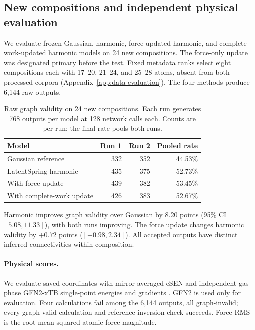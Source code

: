 \subsection{New compositions and independent physical evaluation}\label{sec:fresh-physics}
We evaluate frozen Gaussian, harmonic, force-updated harmonic, and complete-work-updated harmonic models on 24 new compositions. The force-only update was designated primary before the test. Fixed metadata ranks select eight compositions each with 17--20, 21--24, and 25--28 atoms, absent from both processed corpora (Appendix~\ref{app:data-evaluation}). The four methods produce 6,144 raw outputs.

\begin{table}[t]
\centering
\caption{Raw graph validity on 24 new compositions. Each run generates 768 outputs per model at 128 network calls each. Counts are per run; the final rate pools both runs.}
\begin{tabular}{lrrr}
\toprule
Model & Run 1 & Run 2 & Pooled rate\\
\midrule
Gaussian reference &332&352&44.53\%\\
LatentSpring harmonic &435&375&52.73\%\\
With force update &439&382&53.45\%\\
With complete-work update &426&383&52.67\%\\
\bottomrule
\end{tabular}\label{tab:fresh-graph}
\end{table}

Harmonic improves graph validity over Gaussian by 8.20 points (95\% CI $[5.08,11.33]$), with both runs improving. The force update changes harmonic validity by $+0.72$ points ($[-0.98,2.34]$). All accepted outputs have distinct inferred connectivities within composition.

\paragraph{Physical scores.}
We evaluate saved coordinates with mirror-averaged eSEN and independent gas-phase GFN2-xTB single-point energies and gradients \citep{gfn2xtb}. GFN2 is used only for evaluation. Four calculations fail among the 6,144 outputs, all graph-invalid; every graph-valid calculation and reference inversion check succeeds. Force RMS is the root mean squared atomic force magnitude.

